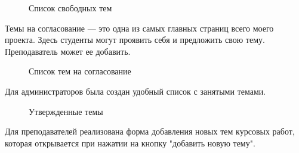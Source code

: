 \documentclass[14pt]{extarticle} %
\begin{document}
\begin{figure}[h]
	\centering	{}
	\caption{Список свободных тем}
	\label{ris1}
\end{figure}
\newpage
Темы на согласование --- это одна из самых главных страниц всего моего проекта. Здесь студенты могут проявить себя и предложить свою тему. Преподаватель может ее добавить.

\begin{figure}[h]
	\centering	{}
	\caption{Список тем на согласование}
	\label{ris1}
\end{figure}

Для администраторов была создан удобный список с занятыми темами.
\begin{figure}[h]
	\centering	{}
	\caption{Утвержденные темы}
	\label{ris1}
\end{figure}
\newpage

Для преподавателей реализована форма добавления новых тем курсовых работ, которая открывается при нажатии на кнопку "добавить новую тему".
\end{document}
